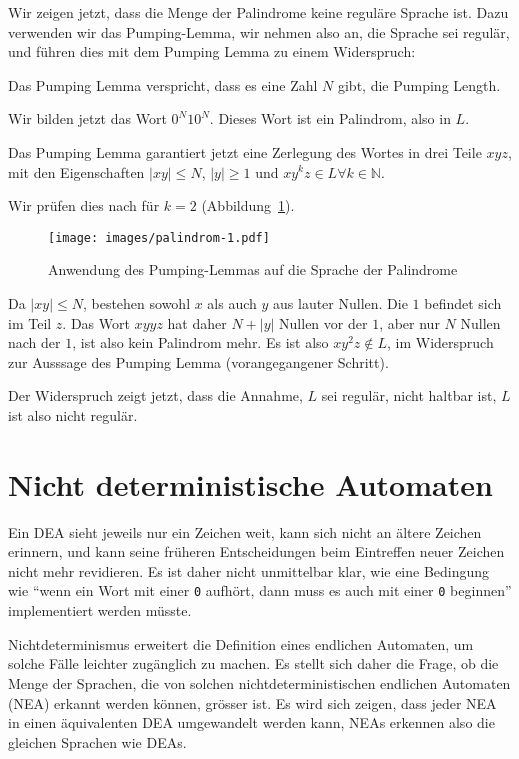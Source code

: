 Wir zeigen jetzt, dass die Menge der Palindrome keine reguläre Sprache ist.
Dazu verwenden wir das Pumping-Lemma, wir nehmen also an, die Sprache
sei regulär, und führen dies mit dem Pumping Lemma zu einem
Widerspruch:
\begin{compactenum}
\item Das Pumping Lemma verspricht, dass es eine Zahl $N$ gibt, die
Pumping Length.
\item Wir bilden jetzt das Wort $0^N10^N$.
Dieses Wort ist ein Palindrom,
also in $L$.
\item Das Pumping Lemma garantiert jetzt eine Zerlegung des Wortes
in drei Teile $xyz$, mit den Eigenschaften $|xy|\le N$, $|y|\ge 1$ und
$xy^kz\in L\forall k\in\mathbb N$.
\item Wir prüfen dies nach für $k=2$ (Abbildung~\ref{regular:pl-palindrome}).
\begin{figure}
\centering
\texttt{[image: images/palindrom-1.pdf]}
\caption{Anwendung des Pumping-Lemmas auf die Sprache der Palindrome
\label{regular:pl-palindrome}}
\end{figure}
Da $|xy|\le N$, bestehen sowohl $x$ als auch $y$ aus lauter Nullen.
Die $1$ befindet sich im Teil $z$.
Das Wort $xyyz$ hat daher $N+|y|$ Nullen vor der $1$, aber nur $N$ Nullen
nach der $1$, ist also kein Palindrom mehr.
Es ist also $xy^2z\not\in L$,
im Widerspruch zur Ausssage des Pumping Lemma (vorangegangener Schritt).
\end{compactenum}
Der Widerspruch zeigt jetzt, dass die Annahme, $L$ sei regulär, nicht
haltbar ist, $L$ ist also nicht regulär.

\section{Nicht deterministische Automaten\label{regulaer:nea}}
Ein DEA sieht jeweils nur ein Zeichen weit, kann sich nicht an ältere
Zeichen erinnern, und kann seine früheren Entscheidungen beim Eintreffen
neuer Zeichen nicht mehr revidieren.
Es ist daher nicht unmittelbar klar,
wie eine Bedingung wie ``wenn ein
Wort mit einer {\tt 0} aufhört, dann muss es auch mit einer {\tt 0}
beginnen'' implementiert werden müsste.

Nichtdeterminismus erweitert 
die Definition eines endlichen Automaten, um solche Fälle leichter 
zugänglich zu machen.
Es stellt sich daher die Frage, ob die Menge 
der Sprachen, die von solchen nichtdeterministischen endlichen Automaten (NEA)
erkannt werden können,
grösser ist.
Es wird sich zeigen, dass jeder NEA
in einen äquivalenten DEA umgewandelt werden kann, NEAs erkennen also
die gleichen Sprachen wie DEAs.

